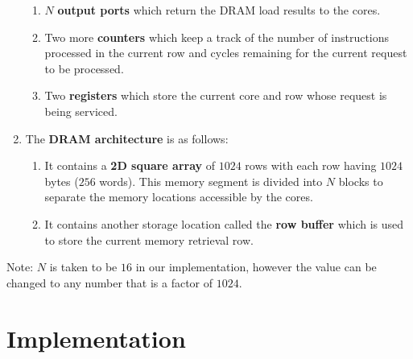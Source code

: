 \documentclass{article}
\begin{document}
\begin{enumerate}
\begin{enumerate}
            \item $N$ \textbf{output ports} which return the DRAM load results to the cores.
            \item Two more \textbf{counters} which keep a track of the number of instructions processed in the current row and cycles remaining for the current request to be processed.
            \item Two \textbf{registers} which store the current core and row whose request is being serviced.
        \end{enumerate}
    \item The \textbf{DRAM architecture} is as follows:
        \begin{enumerate}
            \item It contains a \textbf{2D square array} of $1024$ rows with each row having $1024$ bytes ($256$ words). This memory segment is divided into $N$ blocks to separate the memory locations accessible by the cores.
            \item It contains another storage location called the \textbf{row buffer} which is used to store the current memory retrieval row.
        \end{enumerate}
\end{enumerate}
Note: $N$ is taken to be $16$ in our implementation, however the value can be changed to any number that is a factor of $1024$.


\section{Implementation}
\end{document}
